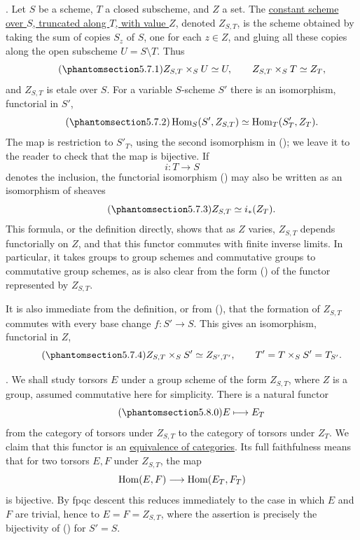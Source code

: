 
\medskip
\noindent {}.  Let $S$ be a scheme, $T$ a closed subscheme, and $Z$
a set.  The \underline{constant scheme over $S$, truncated along $T$,
with value $Z$}, denoted $Z_{S,T}$, is the scheme obtained by taking
the sum of copies $S_z$ of $S$, one for each $z\in Z$, and gluing all
these copies along the open subscheme $U=S\setminus T$.  Thus
\begin{equation}\tag{\SGARefTarget{sga7.sga7i.eviii.n5-7-1}{5.7.1}}
 Z_{S,T}\times_S U\simeq U,
 \qquad
 Z_{S,T}\times_S T\simeq Z_T,
\end{equation}
and $Z_{S,T}$ is etale over $S$.  For a variable $S$-scheme $S'$
there is an isomorphism, functorial in $S'$,
\begin{equation}\tag{\SGARefTarget{sga7.sga7i.eviii.n5-7-2}{5.7.2}}
 \Hom_S(S',Z_{S,T})\simeq\Hom_T(S'_T,Z_T).
\end{equation}
The map is restriction to $S'_T$, using the second isomorphism in
(); we leave it to the reader to check that the map is bijective.
If
\[
 i:T\longrightarrow S
\]
denotes the inclusion, the functorial isomorphism () may also be
written as an isomorphism of sheaves
\begin{equation}\tag{\SGARefTarget{sga7.sga7i.eviii.n5-7-3}{5.7.3}}
 Z_{S,T}\simeq i_*(Z_T).
\end{equation}
This formula, or the definition directly, shows that as $Z$ varies,
$Z_{S,T}$ depends functorially on $Z$, and that this functor commutes
with finite inverse limits.  In particular, it takes groups to group
schemes and commutative groups to commutative group schemes, as is also
clear from the form () of the functor represented by $Z_{S,T}$.

It is also immediate from the definition, or from (), that the
formation of $Z_{S,T}$ commutes with every base change
$f:S'\to S$.  This gives an isomorphism, functorial in $Z$,
\begin{equation}\tag{\SGARefTarget{sga7.sga7i.eviii.n5-7-4}{5.7.4}}
 Z_{S,T}\times_S S'\simeq Z_{S',T'},
 \qquad T'=T\times_S S'=T_{S'}.
\end{equation}

\medskip
\noindent {}.  We shall study torsors $E$ under a group scheme of the
form $Z_{S,T}$, where $Z$ is a group, assumed commutative here for
simplicity.  There is a natural functor
\begin{equation}\tag{\SGARefTarget{sga7.sga7i.eviii.n5-8-0}{5.8.0}}
 E\longmapsto E_T
\end{equation}
from the category of torsors under $Z_{S,T}$ to the category of
torsors under $Z_T$.  We claim that this functor is an
\underline{equivalence of categories}.  Its full faithfulness means
that for two torsors $E,F$ under $Z_{S,T}$, the map
\[
 \operatorname{Hom}(E,F)\longrightarrow\operatorname{Hom}(E_T,F_T)
\]
is bijective.  By fpqc descent this reduces immediately to the case in
which $E$ and $F$ are trivial, hence to $E=F=Z_{S,T}$, where the
assertion is precisely the bijectivity of () for $S'=S$.

